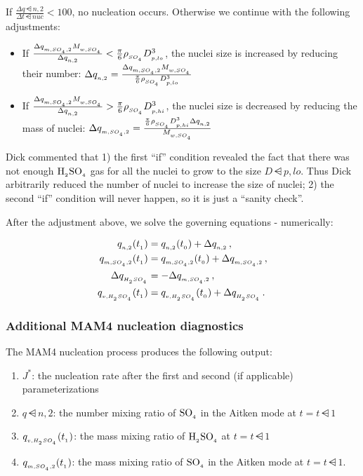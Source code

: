 If $\frac{\Delta q\dsub{n,2}}{\Delta t\dsub{nuc}} < 100$, no nucleation occurs.
Otherwise we continue with the following adjustments:

\begin{itemize}
  \item If $\frac{\Delta q_{_{m,SO_{_4},2}} M_{_{w,SO_{_4}}}}{\Delta q_{_{n,2}}} <
        \frac{\pi}{6} \rho_{_{SO_{_4}}} D_{_{p,lo}}^3$, the nuclei size is
        increased by reducing their number: $\Delta q_{_{n,2}} =
        \frac{\Delta q_{_{m,SO_{_4},2}} M_{_{w,SO_{_4}}}}{\frac{\pi}{6} \rho_{_{SO_{_4}}} D_{_{p,lo}}^3}$
  \item If $\frac{\Delta q_{_{m,SO_{_4},2}} M_{_{w,SO_{_4}}}}{\Delta q_{_{n,2}}} >
        \frac{\pi}{6} \rho_{_{SO_{_4}}} D_{_{p,hi}}^3$, the nuclei size is
        decreased by reducing the mass of nuclei:
        $\Delta q_{_{m,SO_{_4},2}} = \frac{\frac{\pi}{6} \rho_{_{SO_{_4}}} D_{_{p,hi}}^3 \Delta q_{_{n,2}}}{M_{_{w,SO_{_4}}}}$
\end{itemize}

Dick commented that 1) the first ``if'' condition revealed the fact that
there was not enough $\rm H_{_2}SO_{_4}$ gas for all the nuclei to grow to the size
$D\dsub{p,lo}$. Thus Dick arbitrarily reduced the number of nuclei to
increase the size of nuclei; 2) the second ``if'' condition will never
happen, so it is just a ``sanity check''.

After the adjustment above, we solve the governing equations
- numerically:

\begin{align}
  q_{_{n,2}} (t_{_{1}}) &= q_{_{n,2}} (t_{_{0}}) + \Delta q_{_{n,2}} \,, \\
  q_{_{m,SO_{_4},2}} (t_{_{1}}) &= q_{_{m,SO_{_4},2}} (t_{_{0}}) + \Delta q_{_{m,SO_{_4},2}} \,, \\
  \Delta q_{_{H_{_2}SO_{_4}}} &= -\Delta q_{_{m,SO_{_4},2}} \,, \\
  q_{_{v,H_{_2}SO_{_4}}} (t_{_{1}}) &= q_{_{v,H_{_2}SO_{_4}}} (t_{_{0}}) + \Delta q_{_{H_{_2}SO_{_4}}} \,.
\end{align}

\subsubsection{Additional MAM4 nucleation diagnostics} \label{output}

The MAM4 nucleation process produces the following output:

\begin{enumerate}
  \item $J^*$: the nucleation rate after the first and second (if applicable)
        parameterizations
  \item $q\dsub{n,2}$: the number mixing ratio of $\rm SO_{_4}$ in the Aitken mode at
        $t = t\dsub1$
  \item $q_{_{v,H_{_2}SO_{_4}}} (t_{_{1}})$: the mass mixing ratio of $\rm H_{_2}SO_{_4}$ at
        $t = t\dsub1$
  \item $q_{_{m,SO_{_4},2}} (t_{_{1}})$: the mass mixing ratio of $\rm SO_{_4}$ in the
        Aitken mode at $t = t\dsub1$.
\end{enumerate}

